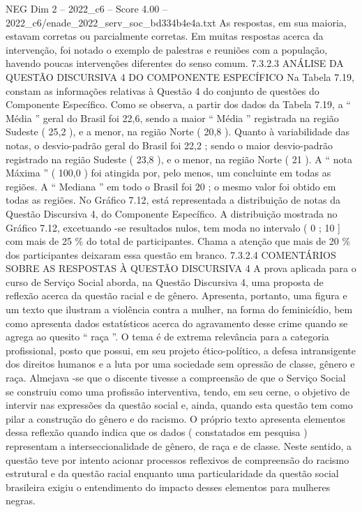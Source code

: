 \begin{textsample}{NEG Dim 2 – 2022\_c6 – Score 4.00 – 2022\_c6/enade\_2022\_serv\_soc\_bd334b4e4a.txt}
As respostas, em sua maioria, estavam corretas ou parcialmente corretas.
Em muitas respostas acerca da intervenção, foi notado o exemplo de palestras e reuniões com a população, havendo poucas intervenções diferentes do senso comum. 7.3.2.3 ANÁLISE DA QUESTÃO DISCURSIVA 4 DO COMPONENTE ESPECÍFICO Na Tabela 7.19, constam as informações relativas à Questão 4 do conjunto de questões do Componente Específico.
Como se observa, a partir dos dados da Tabela 7.19, a “ Média ” geral do Brasil foi 22,6, sendo a maior “ Média ” registrada na região Sudeste ( 25,2 ), e a menor, na região Norte ( 20,8 ).
Quanto à variabilidade das notas, o desvio-padrão geral do Brasil foi 22,2 ; sendo o maior desvio-padrão registrado na região Sudeste ( 23,8 ), e o menor, na região Norte ( 21 ).
A “ nota Máxima ” ( 100,0 ) foi atingida por, pelo menos, um concluinte em todas as regiões.
A “ Mediana ” em todo o Brasil foi 20 ; o mesmo valor foi obtido em todas as regiões.
No Gráfico 7.12, está representada a distribuição de notas da Questão Discursiva 4, do Componente Específico.
A distribuição mostrada no Gráfico 7.12, excetuando -se resultados nulos, tem moda no intervalo ( 0 ; 10 ] com mais de 25 \% do total de participantes.
Chama a atenção que mais de 20 \% dos participantes deixaram essa questão em branco. 7.3.2.4 COMENTÁRIOS SOBRE AS RESPOSTAS À QUESTÃO DISCURSIVA 4 A prova aplicada para o curso de Serviço Social aborda, na Questão Discursiva 4, uma proposta de reflexão acerca da questão racial e de gênero.
Apresenta, portanto, uma figura e um texto que ilustram a violência contra a mulher, na forma do feminicídio, bem como apresenta dados estatísticos acerca do agravamento desse crime quando se agrega ao quesito “ raça ”.
O tema é de extrema relevância para a categoria profissional, posto que possui, em seu projeto ético-político, a defesa intransigente dos direitos humanos e a luta por uma sociedade sem opressão de classe, gênero e raça.
Almejava -se que o discente tivesse a compreensão de que o Serviço Social se construiu como uma profissão interventiva, tendo, em seu cerne, o objetivo de intervir nas expressões da questão social e, ainda, quando esta questão tem como pilar a construção do gênero e do racismo.
O próprio texto apresenta elementos dessa reflexão quando indica que os dados ( constatados em pesquisa ) representam a interseccionalidade de gênero, de raça e de classe.
Neste sentido, a questão teve por intento acionar processos reflexivos de compreensão do racismo estrutural e da questão racial enquanto uma particularidade da questão social brasileira exigiu o entendimento do impacto desses elementos para mulheres negras.

\end{textsample}
